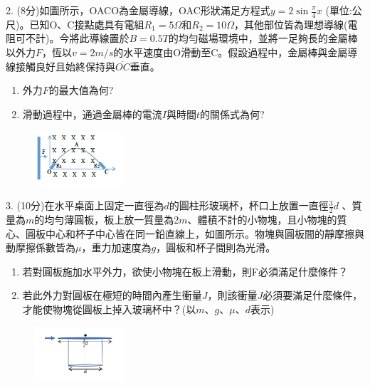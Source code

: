 \documentclass[cn,10pt,math=newtx]{elegantbook}
\begin{document}
\begin{example}
   2. (8分)如圖所示，OACO為金屬導線，OAC形狀滿足方程式$y = 2\sin{\frac{\pi}{4} x}$
(單位:公尺)。已知O、C接點處具有電組$R_1=5 \Omega$和$R_2=10 \Omega$，其他部位皆為理想導線(電阻可不計)。今將此導線置於$B=0.5T$的均勻磁場環境中，並將一足夠長的金屬棒以外力$F$，恆以$v=2 m/s$的水平速度由O滑動至C。假設過程中，金屬棒與金屬導線接觸良好且始終保持與$\overline{OC}$垂直。 \begin{enumerate}[label=(\arabic*)] 
  \item 外力$F$的最大值為何?
  \item 滑動過程中，通過金屬棒的電流$I$與時間$t$的關係式為何?
    \end{enumerate}
    \rightline{[中壢高中教甄109]}
\end{example}
\begin{solution}
    
\end{solution}
\begin{figure}[htbp]
    \flushright
    \includegraphics[width=0.3\textwidth]{image/109中壢222.png}
  \end{figure}
\newpage


\begin{example}
   3. (10分)在水平桌面上固定一直徑為$d$的圓柱形玻璃杯，杯口上放置一直徑$\frac{3}{2} d$
、質量為$m$的均勻薄圓板，板上放一質量為2$m$、體積不計的小物塊，且小物塊的質心、圓板中心和杯子中心皆在同一鉛直線上，如圖所示。物塊與圓板間的靜摩擦與動摩擦係數皆為$\mu$，重力加速度為$g$，圓板和杯子間則為光滑。

\begin{enumerate}[label=(\arabic*)] 
  \item 若對圓板施加水平外力，欲使小物塊在板上滑動，則F必須滿足什麼條件？
  \item 若此外力對圓板在極短的時間內產生衝量$J$，則該衝量$J$必須要滿足什麼條件，才能使物塊從圓板上掉入玻璃杯中？(以$m、g、\mu、d$表示)
    \end{enumerate}
    \rightline{[中壢高中教甄109]}
\end{example}
\begin{solution}
    
\end{solution}
\begin{figure}[htbp]
    \flushright
    \includegraphics[width=0.3\textwidth]{image/109中壢223.png}
  \end{figure}
\newpage
\end{document}

